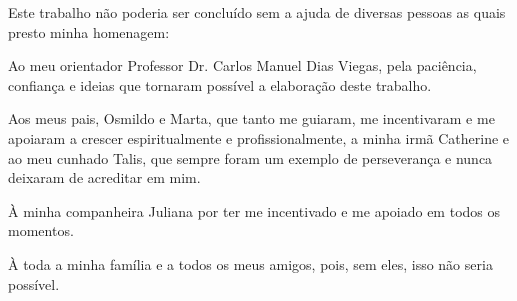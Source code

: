 \begin{agradecimentos}

    Este trabalho não poderia ser concluído sem a ajuda de diversas pessoas as
    quais presto minha homenagem:

    Ao meu orientador Professor Dr. Carlos Manuel Dias Viegas, pela paciência,
    confiança e ideias que tornaram possível a elaboração deste trabalho.

    Aos meus pais, Osmildo e Marta, que tanto me guiaram, me incentivaram e
    me apoiaram a crescer espiritualmente e profissionalmente, a minha irmã Catherine e ao meu cunhado Talis,
    que sempre foram um exemplo de perseverança e nunca deixaram de acreditar em mim.

    À minha companheira Juliana por ter me incentivado e me apoiado em todos
    os momentos.

    À toda a minha família e a todos os meus amigos, pois, sem eles, isso não
    seria possível.

\end{agradecimentos}
